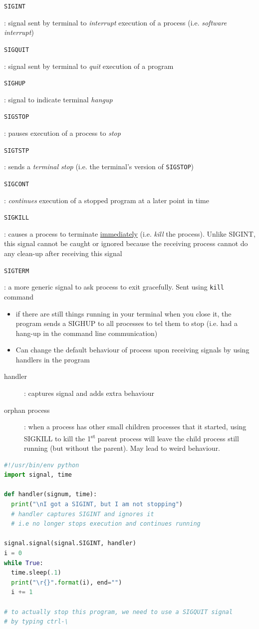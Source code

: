 \documentclass[letterpaper,12pt]{article}
\newcommand*{\lstitem}[1]{
  \setbox0\hbox{\lstinline{#1}}
  \item[\usebox0]
}
\begin{document}
\begin{description}
 \lstitem{SIGINT}: signal sent by terminal to \textit{interrupt} execution of a process (i.e. \textit{software interrupt})
 \lstitem{SIGQUIT}: signal sent by terminal to \textit{quit} execution of a program
 \lstitem{SIGHUP}: signal to indicate terminal \textit{hangup}
 \lstitem{SIGSTOP}: pauses execution of a process to \textit{stop}
 \lstitem{SIGTSTP}: sends a \textit{terminal stop} (i.e. the terminal's version of \lstinline{SIGSTOP})
 \lstitem{SIGCONT}: \textit{continues} execution of a stopped program at a later point in time
 \lstitem{SIGKILL}: causes a process to terminate \underline{immediately} (i.e. \textit{kill} the process). Unlike SIGINT, this signal cannot be caught or ignored because the receiving process cannot do any clean-up after receiving this signal
 \lstitem{SIGTERM}: a more generic signal to ask process to exit gracefully. Sent using \lstinline{kill} command
\end{description}

\begin{itemize}
 \item if there are still things running in your terminal when you close it, the program sends a SIGHUP to all processes to tel them to stop (i.e. had a hang-up in the command line communication)
 \item Can change the default behaviour of process upon receiving signals by using handlers in the program
\end{itemize}

\begin{description}
 \item[handler]: captures signal and adds extra behaviour
 \item[orphan process]: when a process has other small children processes that it started, using SIGKILL to kill the 1\textsuperscript{st} parent process will leave the child process still running (but without the parent). May lead to weird behaviour.
\end{description}


\begin{lstlisting}[language=python]
#!/usr/bin/env python
import signal, time

def handler(signum, time):
  print("\nI got a SIGINT, but I am not stopping")
  # handler captures SIGINT and ignores it
  # i.e no longer stops execution and continues running

signal.signal(signal.SIGINT, handler)
i = 0
while True:
  time.sleep(.1)
  print("\r{}".format(i), end="")
  i += 1

# to actually stop this program, we need to use a SIGQUIT signal
# by typing ctrl-\
\end{lstlisting}
\end{document}
